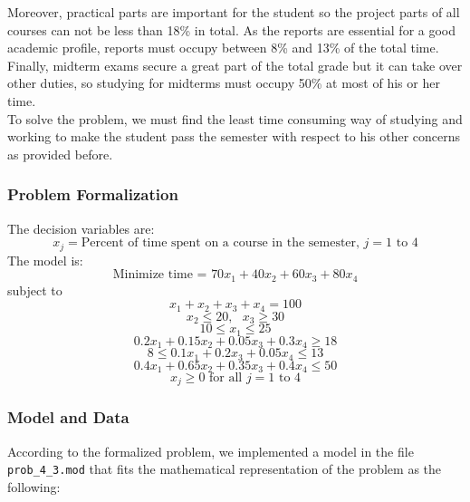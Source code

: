 Moreover, practical parts are important for the student so the project parts of all courses can not be less than 18\% in total. As the reports are essential for a good academic profile, reports must occupy between 8\% and 13\% of the total time. Finally, midterm exams secure a great part of the total grade but it can take over other duties, so studying for midterms must occupy 50\% at most of his or her time. \\
To solve the problem, we must find the least time consuming way of studying and working to make the student pass the semester with respect to his other concerns as provided before.
\subsubsection{Problem Formalization}
The decision variables are: \\
\[x_j = \text{Percent of time spent on a course in the semester, } j = 1\text{ to }4\]
The model is: \\
\[\text{Minimize time = } 70x_1 + 40x_2 + 60x_3 + 80x_4\]
subject to
\[x_1 + x_2 + x_3 + x_ 4 = 100\]
\[x_2 \leq 20, \text{{ }}x_3 \geq 30\]
\[10 \leq x_1 \leq 25\]
\[0.2x_1 + 0.15x_2 + 0.05x_3 + 0.3x_4 \geq 18 \]
\[8 \leq 0.1x_1 + 0.2x_3 + 0.05x_4 \leq 13 \]
\[0.4x_1 + 0.65x_2 + 0.35x_3 + 0.4x_4 \leq 50 \]
\[x_j \geq 0 \text{ for all } j = 1\text{ to }4 \]

\subsubsection{Model and Data}
According to the formalized problem, we implemented a model in the file \texttt{prob\_4\_3.mod} that fits the mathematical representation of the problem as the following:

